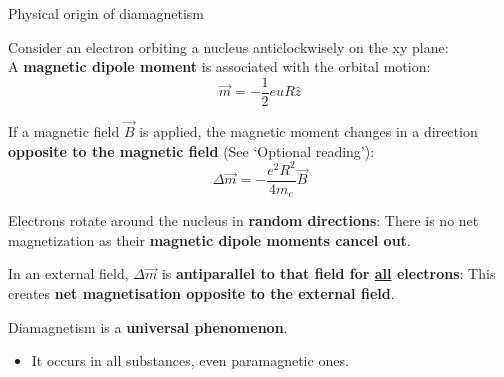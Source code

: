 \begin{frame}{Physical origin of diamagnetism}

Consider an electron orbiting a nucleus anticlockwisely on the xy plane:\\
A {\bf magnetic dipole moment} is associated with the orbital motion:
\begin{equation*}
  \vec{m} = - \frac{1}{2} e u R \hat{z}
\end{equation*}

If a magnetic field $\vec{B}$ is applied, the magnetic moment changes
in a direction {\bf opposite to the magnetic field} (See `Optional reading'):
\begin{equation*}
    {\Delta}\vec{m} =
      - \frac{e^2 R^2}{4m_e} \vec{B}
\end{equation*}

Electrons rotate around the nucleus in {\bf random directions}:
There is no net magnetization as their {\bf magnetic dipole moments cancel out}.\\
\vspace{0.1cm}

In an external field,
${\Delta}\vec{m}$ is {\bf antiparallel to that field for \underline{all} electrons}:
This creates {\bf net magnetisation opposite to the external field}.\\
\vspace{0.1cm}

Diamagnetism is a {\bf universal phenomenon}.
\begin{itemize}
  \item It occurs in all substances, even paramagnetic ones.
\end{itemize}

\end{frame}

%
%
%

